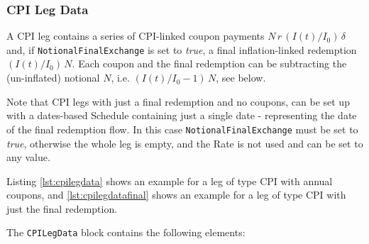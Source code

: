 \subsubsection{CPI Leg Data}
\label{ss:cpilegdata}

A CPI leg contains a series of CPI-linked coupon payments $N\,r\,({I(t)}/{I_0})\,\delta$ and, if \lstinline!NotionalFinalExchange! is set to \emph{true}, a final
inflation-linked redemption $(I(t)/I_0)\,N$. Each coupon and the final redemption can be
subtracting the (un-inflated) notional $N$, i.e. $(I(t)/I_0-1)\,N$,
see below.

Note that CPI legs with just a final redemption and no coupons, can be set up with a dates-based Schedule containing just a single date - representing the date of the final redemption flow. In this case \lstinline!NotionalFinalExchange! must be set to \emph{true}, otherwise the whole leg is empty, and the Rate is not used and can be set to any value. 

Listing \ref{lst:cpilegdata} shows an example for a leg of type CPI with annual coupons, and \ref{lst:cpilegdatafinal} shows an example for a leg of type CPI with just the final redemption. 

The  \lstinline!CPILegData! block contains the following elements:

